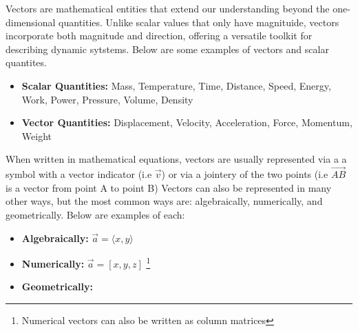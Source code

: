 \documentclass[14pt]{article}
\begin{document}
        \begin{flushleft}

            Vectors are mathematical entities that extend our understanding beyond the 
            one-dimensional quantities. Unlike scalar values that only have magnituide, 
            vectors incorporate both magnitude and direction, offering a versatile toolkit
            for describing dynamic sytstems. Below are some examples of vectors and scalar
            quantites.

            \begin{itemize}
                \item \textbf{Scalar Quantities:} Mass, Temperature, Time, Distance, Speed, 
                Energy, Work, Power, Pressure, Volume, Density
                \item \textbf{Vector Quantities:} Displacement, Velocity, Acceleration, 
                Force, Momentum, Weight
            \end{itemize}

            When written in mathematical equations, vectors are usually represented via a a symbol with a vector indicator (i.e $\vec{v}$)
            or via a jointery of the two points (i.e $\vec{AB}$ is a vector from point A to point B) Vectors 
            can also be represented in many other ways, but the most common ways are: algebraically, numerically, 
            and geometrically. Below are examples of each:

            \begin{itemize}

                \item \textbf{Algebraically:} $\vec{a} = \langle x, y \rangle$
                \item  \textbf{Numerically:} $\vec{a} = \left[ x, y, z \right]$ \footnote{Numerical vectors can also be written as column matrices}
                \item { \textbf{Geometrically:} 

                    \begin{center}

                        \begin{tikzpicture}
                        

\end{tikzpicture}
\end{center}}
\end{itemize}
\end{flushleft}
\end{document}
